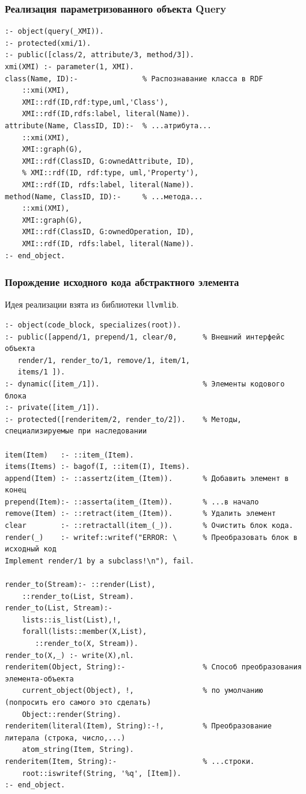 \documentclass[10pt]{beamer}
\begin{document}
\begin{frame}[fragile]
  \frametitle{Реализация параметризованного объекта Query}
\begin{verbatim}
:- object(query(_XMI)).
:- protected(xmi/1).
:- public([class/2, attribute/3, method/3]).
xmi(XMI) :- parameter(1, XMI).
class(Name, ID):-               % Распознавание класса в RDF
    ::xmi(XMI),
    XMI::rdf(ID,rdf:type,uml,'Class'),
    XMI::rdf(ID,rdfs:label, literal(Name)).
attribute(Name, ClassID, ID):-  % ...атрибута...
    ::xmi(XMI),
    XMI::graph(G),
    XMI::rdf(ClassID, G:ownedAttribute, ID),
    % XMI::rdf(ID, rdf:type, uml,'Property'),
    XMI::rdf(ID, rdfs:label, literal(Name)).
method(Name, ClassID, ID):-     % ...метода...
    ::xmi(XMI),
    XMI::graph(G),
    XMI::rdf(ClassID, G:ownedOperation, ID),
    XMI::rdf(ID, rdfs:label, literal(Name)).
:- end_object.
\end{verbatim}
\end{frame}

\begin{frame}[fragile]
  \frametitle{Порождение исходного кода абстрактного элемента}
  Идея реализации взята из библиотеки \verb|llvmlib|.
\begin{verbatim}
:- object(code_block, specializes(root)).
:- public([append/1, prepend/1, clear/0,      % Внешний интерфейс объекта
   render/1, render_to/1, remove/1, item/1,
   items/1 ]).
:- dynamic([item_/1]).                        % Элементы кодового блока
:- private([item_/1]).
:- protected([renderitem/2, render_to/2]).    % Методы, специализируемые при наследовании

item(Item)   :- ::item_(Item).
items(Items) :- bagof(I, ::item(I), Items).
append(Item) :- ::assertz(item_(Item)).       % Добавить элемент в конец
prepend(Item):- ::asserta(item_(Item)).       % ...в начало
remove(Item) :- ::retract(item_(Item)).       % Удалить элемент
clear        :- ::retractall(item_(_)).       % Очистить блок кода.
render(_)    :- writef::writef("ERROR: \      % Преобразовать блок в исходный код
Implement render/1 by a subclass!\n"), fail.

render_to(Stream):- ::render(List),
    ::render_to(List, Stream).
render_to(List, Stream):-
    lists::is_list(List),!,
    forall(lists::member(X,List),
       ::render_to(X, Stream)).
render_to(X,_) :- write(X),nl.
renderitem(Object, String):-                  % Способ преобразования элемента-объекта
    current_object(Object), !,                % по умолчанию (попросить его самого это сделать)
    Object::render(String).
renderitem(literal(Item), String):-!,         % Преобразование литерала (строка, число,...)
    atom_string(Item, String).
renderitem(Item, String):-                    % ...строки.
    root::iswritef(String, '%q', [Item]).
:- end_object.
\end{verbatim}
\end{frame}
\end{document}
